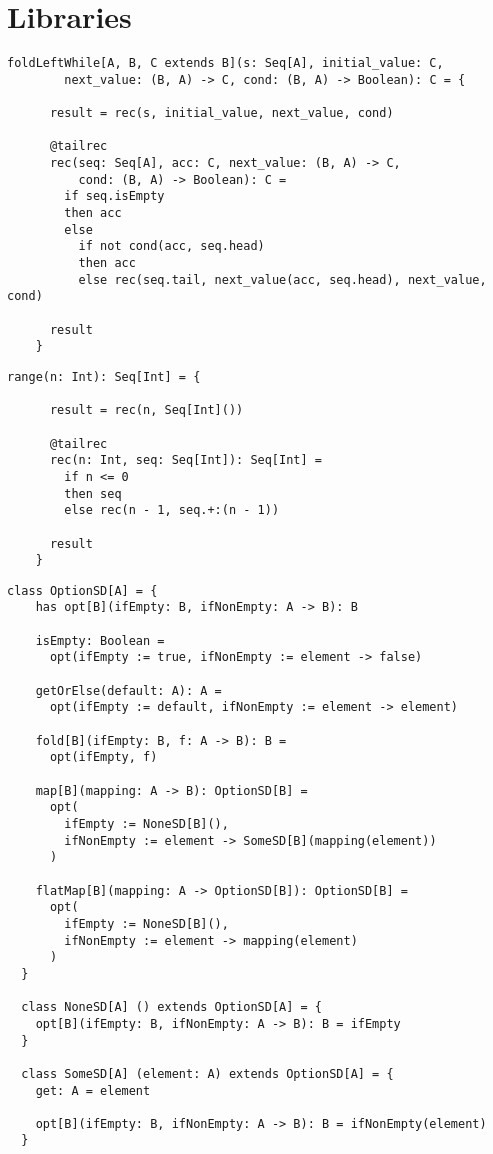 \chapter{Libraries}

\begin{lstlisting}[label={lst:foldLeftWhile}]
    foldLeftWhile[A, B, C extends B](s: Seq[A], initial_value: C,
        next_value: (B, A) -> C, cond: (B, A) -> Boolean): C = {

      result = rec(s, initial_value, next_value, cond)

      @tailrec
      rec(seq: Seq[A], acc: C, next_value: (B, A) -> C,
          cond: (B, A) -> Boolean): C =
        if seq.isEmpty
        then acc
        else
          if not cond(acc, seq.head)
          then acc
          else rec(seq.tail, next_value(acc, seq.head), next_value, cond)

      result
    }
\end{lstlisting}

\begin{lstlisting}[label={lst:range}]
    range(n: Int): Seq[Int] = {

      result = rec(n, Seq[Int]())

      @tailrec
      rec(n: Int, seq: Seq[Int]): Seq[Int] =
        if n <= 0
        then seq
        else rec(n - 1, seq.+:(n - 1))

      result
    }
\end{lstlisting}


\begin{lstlisting}[label={lst:option}]
  class OptionSD[A] = {
    has opt[B](ifEmpty: B, ifNonEmpty: A -> B): B

    isEmpty: Boolean =
      opt(ifEmpty := true, ifNonEmpty := element -> false)

    getOrElse(default: A): A =
      opt(ifEmpty := default, ifNonEmpty := element -> element)

    fold[B](ifEmpty: B, f: A -> B): B =
      opt(ifEmpty, f)

    map[B](mapping: A -> B): OptionSD[B] =
      opt(
        ifEmpty := NoneSD[B](),
        ifNonEmpty := element -> SomeSD[B](mapping(element))
      )

    flatMap[B](mapping: A -> OptionSD[B]): OptionSD[B] =
      opt(
        ifEmpty := NoneSD[B](),
        ifNonEmpty := element -> mapping(element)
      )
  }

  class NoneSD[A] () extends OptionSD[A] = {
    opt[B](ifEmpty: B, ifNonEmpty: A -> B): B = ifEmpty
  }

  class SomeSD[A] (element: A) extends OptionSD[A] = {
    get: A = element

    opt[B](ifEmpty: B, ifNonEmpty: A -> B): B = ifNonEmpty(element)
  }
\end{lstlisting}

